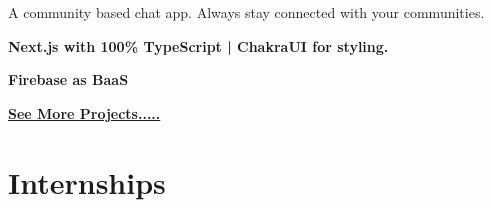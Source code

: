 \documentclass[]{deedy-resume-openfont}
\begin{document}
\begin{minipage}[t]{0.67\textwidth}

A community based chat app. Always stay connected with your communities.\\
\begin{tightemize}
\item \textbf{Next.js with 100\% TypeScript | ChakraUI for styling.}
\item \textbf{Firebase as BaaS}
\end{tightemize}
\sectionsep
\href{https://kishans.in/projects}{\bf{See More Projects.....}}


\section{Internships}


\end{minipage}
\end{document}
